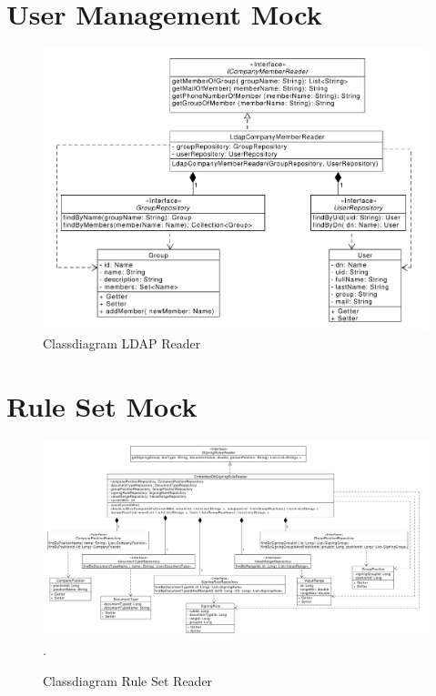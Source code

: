 \section{User Management Mock}
\begin{figure}[h!]
	\includegraphics[width=\textwidth]{./implementation/images/ldapMock.pdf}
	\centering
	\caption{Classdiagram LDAP Reader}
	\label{fig:ldapMock}
\end{figure}

\section{Rule Set Mock}
\begin{landscape}
	\begin{figure}[h!]
		\includegraphics[width=1.48\textwidth]{./implementation/images/dbMock.pdf}.
		\centering
		\caption{Classdiagram Rule Set Reader}
		\label{fig:dbMock}
	\end{figure}
\end{landscape}